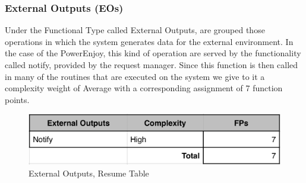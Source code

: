 \documentclass[a4paper,10pt]{article}
\begin{document}
  \subsubsection{External Outputs (EOs)} Under the Functional Type called External Outputs, are grouped those operations in which the system generates
  data for the external environment. In the case of the PowerEnjoy, this kind of operation are served by the functionality called notify, provided
  by the request manager. Since this function is then called in many of the routines that are executed on the system we give to it a
  complexity weight of Average with a corresponding assignment of 7 function points.
  \begin{figure}[h]
  \centering
    \includegraphics[scale=0.2]{Resources/outputs.png}
    \caption{External Outputs, Resume Table}
  \end{figure}
\end{document}
